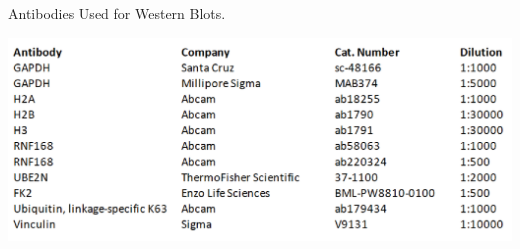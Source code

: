 \begin{table}
\caption{Antibodies Used for Western Blots.}
\centering
\includegraphics[width=1\textwidth]{supplement/tables/STable_Western_antibodies.png}
\label{table:Western_antibodies}
\end{table}
